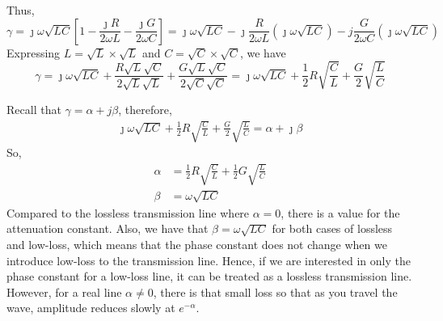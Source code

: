 Thus,
\begin{dmath}    
\gamma = \jmath\omega\sqrt{LC} \left[1- \frac{\jmath R}{2\omega L} - \frac{\jmath G}{2\omega C}\right] = \jmath\omega\sqrt{LC} - \jmath\frac{R}{2\omega L}\left(\jmath\omega\sqrt{LC}\right) - j\frac{G}{2\omega C}\left(\jmath\omega\sqrt{LC}\right)
\end{dmath}
Expressing $L = \sqrt{L} \times \sqrt{L}$ and $C = \sqrt{C} \times \sqrt{C}$, we have
\begin{dmath*}
\gamma = \jmath\omega\sqrt{LC} + \frac{R\sqrt{L}\sqrt{C}}{2\sqrt{L}\sqrt{L}} + \frac{G\sqrt{L}\sqrt{C}}{2\sqrt{C}\sqrt{C}} = \jmath\omega\sqrt{LC} + \frac{1}{2}R\sqrt{\frac{C}{L}} + \frac{G}{2}\sqrt{\frac{L}{C}} 
\end{dmath*}

Recall that $\gamma = \alpha + j\beta$, therefore,
\begin{align*}
\jmath\omega\sqrt{LC} + \frac{1}{2}R\sqrt{\frac{C}{L}} + \frac{G}{2}\sqrt{\frac{L}{C}} = \alpha + \jmath\beta
\end{align*}
So,
\begin{align}
\alpha &= \frac{1}{2}R\sqrt{\frac{C}{L}} + \frac{1}{2}G\sqrt{\frac{L}{C}}\label{eqn:lowlossalpha}\\
\beta &= \omega\sqrt{LC}
\end{align}
Compared to the lossless transmission line where $\alpha = 0$, there is a value for the attenuation constant. Also, we have that $\beta = \omega\sqrt{LC}$ for both cases of lossless and low-loss, which means that the phase constant does not change when we introduce low-loss to the transmission line. Hence, if we are interested in only the phase constant for a low-loss line, it can be treated as a lossless transmission line. However, for a real line $\alpha \neq 0$, there is that small loss so that as you travel the wave, amplitude reduces slowly at $e^{-\alpha}$.

